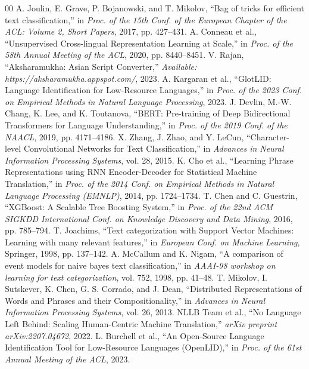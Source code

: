 \documentclass[conference]{IEEEtran}
\begin{document}
\FloatBarrier
\begin{thebibliography}{00}
 A. Joulin, E. Grave, P. Bojanowski, and T. Mikolov, ``Bag of tricks for efficient text classification,'' in \textit{Proc. of the 15th Conf. of the European Chapter of the ACL: Volume 2, Short Papers}, 2017, pp. 427--431.
 A. Conneau et al., ``Unsupervised Cross-lingual Representation Learning at Scale,'' in \textit{Proc. of the 58th Annual Meeting of the ACL}, 2020, pp. 8440--8451.
 V. Rajan, ``Aksharamukha: Asian Script Converter,'' \textit{Available: https://aksharamukha.appspot.com/}, 2023.
 A. Kargaran et al., ``GlotLID: Language Identification for Low-Resource Languages,'' in \textit{Proc. of the 2023 Conf. on Empirical Methods in Natural Language Processing}, 2023.
 J. Devlin, M.-W. Chang, K. Lee, and K. Toutanova, ``BERT: Pre-training of Deep Bidirectional Transformers for Language Understanding,'' in \textit{Proc. of the 2019 Conf. of the NAACL}, 2019, pp. 4171--4186.
 X. Zhang, J. Zhao, and Y. LeCun, ``Character-level Convolutional Networks for Text Classification,'' in \textit{Advances in Neural Information Processing Systems}, vol. 28, 2015.
 K. Cho et al., ``Learning Phrase Representations using RNN Encoder-Decoder for Statistical Machine Translation,'' in \textit{Proc. of the 2014 Conf. on Empirical Methods in Natural Language Processing (EMNLP)}, 2014, pp. 1724--1734.
 T. Chen and C. Guestrin, ``XGBoost: A Scalable Tree Boosting System,'' in \textit{Proc. of the 22nd ACM SIGKDD International Conf. on Knowledge Discovery and Data Mining}, 2016, pp. 785--794.
 T. Joachims, ``Text categorization with Support Vector Machines: Learning with many relevant features,'' in \textit{European Conf. on Machine Learning}, Springer, 1998, pp. 137--142.
 A. McCallum and K. Nigam, ``A comparison of event models for naive bayes text classification,'' in \textit{AAAI-98 workshop on learning for text categorization}, vol. 752, 1998, pp. 41--48.
 T. Mikolov, I. Sutskever, K. Chen, G. S. Corrado, and J. Dean, ``Distributed Representations of Words and Phrases and their Compositionality,'' in \textit{Advances in Neural Information Processing Systems}, vol. 26, 2013.
 NLLB Team et al., ``No Language Left Behind: Scaling Human-Centric Machine Translation,'' \textit{arXiv preprint arXiv:2207.04672}, 2022.
 L. Burchell et al., ``An Open-Source Language Identification Tool for Low-Resource Languages (OpenLID),'' in \textit{Proc. of the 61st Annual Meeting of the ACL}, 2023.

\end{thebibliography}
\end{document}

